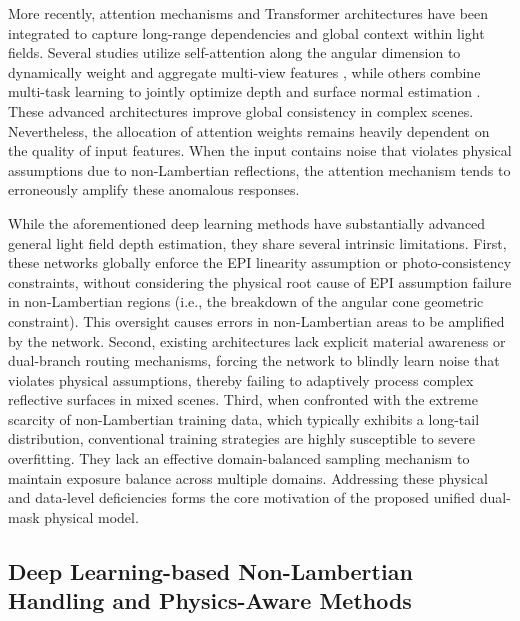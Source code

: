 \documentclass[lettersize,journal]{IEEEtran}
\begin{document}
More recently, attention mechanisms and Transformer architectures have been integrated to capture long-range dependencies and global context within light fields. Several studies utilize self-attention along the angular dimension to dynamically weight and aggregate multi-view features \cite{ronneberger2015}, while others combine multi-task learning to jointly optimize depth and surface normal estimation \cite{he2016}. These advanced architectures improve global consistency in complex scenes. Nevertheless, the allocation of attention weights remains heavily dependent on the quality of input features. When the input contains noise that violates physical assumptions due to non-Lambertian reflections, the attention mechanism tends to erroneously amplify these anomalous responses.

While the aforementioned deep learning methods have substantially advanced general light field depth estimation, they share several intrinsic limitations. First, these networks globally enforce the EPI linearity assumption or photo-consistency constraints, without considering the physical root cause of EPI assumption failure in non-Lambertian regions (i.e., the breakdown of the angular cone geometric constraint). This oversight causes errors in non-Lambertian areas to be amplified by the network. Second, existing architectures lack explicit material awareness or dual-branch routing mechanisms, forcing the network to blindly learn noise that violates physical assumptions, thereby failing to adaptively process complex reflective surfaces in mixed scenes. Third, when confronted with the extreme scarcity of non-Lambertian training data, which typically exhibits a long-tail distribution, conventional training strategies are highly susceptible to severe overfitting. They lack an effective domain-balanced sampling mechanism to maintain exposure balance across multiple domains. Addressing these physical and data-level deficiencies forms the core motivation of the proposed unified dual-mask physical model.

\subsection{Deep Learning-based Non-Lambertian Handling and Physics-Aware Methods}
\end{document}
